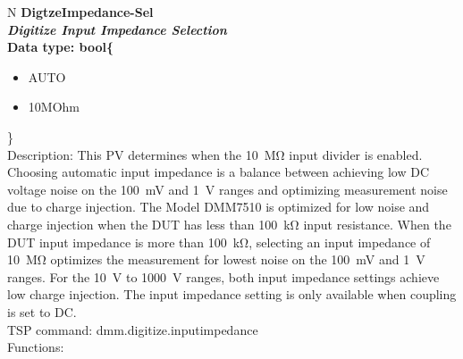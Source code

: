\documentclass[openany]{article}
\begin{document}
		\begin{tabular}{N}
			\hline
			\bfseries DigtzeImpedance-Sel\label{pv:digtzeimpedance-sel} \\ \hline
			\emph{Digitize Input Impedance Selection} \\
			Data type: bool\{\begin{itemize}[noitemsep]
				\small
				\item[] AUTO
				\item[] 10MOhm
			\end{itemize}\} \\

			Description: This PV determines when the \SI{10}{\mega\ohm} input divider is enabled. Choosing automatic input impedance is a balance between achieving low DC voltage noise on the \SI{100}{\milli\volt} and \SI{1}{\volt} ranges and optimizing measurement noise due to charge injection. The Model DMM7510 is optimized for low noise and charge injection when the DUT has less than \SI{100}{\kilo\ohm} input resistance. When the DUT input impedance is more than \SI{100}{\kilo\ohm}, selecting an input impedance of \SI{10}{\mega\ohm} optimizes the measurement for lowest noise on the \SI{100}{\milli\volt} and \SI{1}{\volt} ranges. For the \SI{10}{\volt} to \SI{1000}{\volt} ranges, both input impedance settings achieve low charge injection. The input impedance setting is only available when coupling is set to DC. \\
			TSP command: dmm.digitize.inputimpedance \\
			Functions: \\
			\arrayrulecolor{\FuncTableBorderColor}

		\end{tabular}
\end{document}
